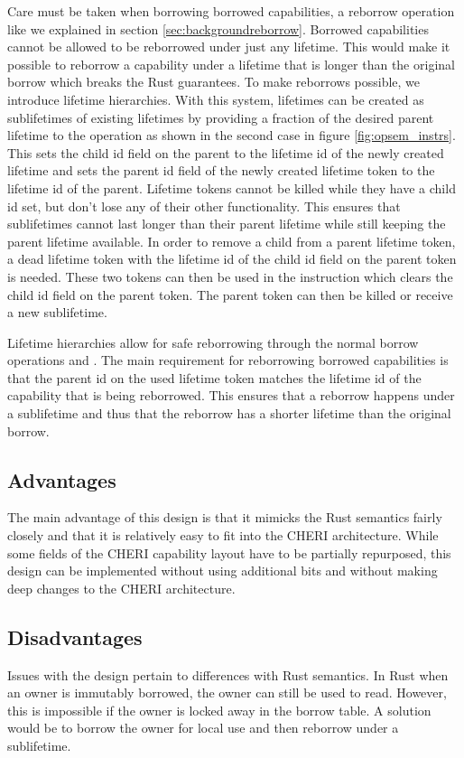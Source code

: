 Care must be taken when borrowing borrowed capabilities, a reborrow operation like we explained in section \ref{sec:backgroundreborrow}.
Borrowed capabilities cannot be allowed to be reborrowed under just any lifetime.
This would make it possible to reborrow a capability under a lifetime that is longer than the original borrow which breaks the Rust guarantees.
To make reborrows possible, we introduce lifetime hierarchies.
With this system, lifetimes can be created as sublifetimes of existing lifetimes by providing a fraction of the desired parent lifetime to the  operation as shown in the second case in figure \ref{fig:opsem_instrs}.
This sets the child id field on the parent to the lifetime id of the newly created lifetime and sets the parent id field of the newly created lifetime token to the lifetime id of the parent.
Lifetime tokens cannot be killed while they have a child id set, but don't lose any of their other functionality.
This ensures that sublifetimes cannot last longer than their parent lifetime while still keeping the parent lifetime available.
In order to remove a child from a parent lifetime token, a dead lifetime token with the lifetime id of the child id field on the parent token is needed.
These two tokens can then be used in the  instruction which clears the child id field on the parent token.
The parent token can then be killed or receive a new sublifetime.

Lifetime hierarchies allow for safe reborrowing through the normal borrow operations  and .
The main requirement for reborrowing borrowed capabilities is that the parent id on the used lifetime token matches the lifetime id of the capability that is being reborrowed.
This ensures that a reborrow happens under a sublifetime and thus that the reborrow has a shorter lifetime than the original borrow.

\subsection{Advantages}
The main advantage of this design is that it mimicks the Rust semantics fairly closely and that it is relatively easy to fit into the CHERI architecture. While some fields of the CHERI capability layout have to be partially repurposed, this design can be implemented without using additional bits and without making deep changes to the CHERI architecture.

\subsection{Disadvantages}
\label{sec:designdisadvantages}
Issues with the design pertain to differences with Rust semantics. In Rust when an owner is immutably borrowed, the owner can still be used to read.
However, this is impossible if the owner is locked away in the borrow table. A solution would be to borrow the owner for local use and then reborrow under a sublifetime.

